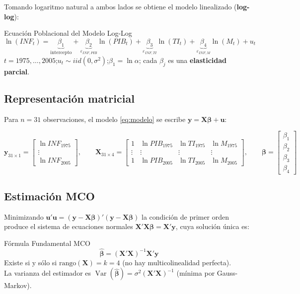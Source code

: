 \documentclass[12pt,a4paper]{article}
\newcommand\bhat{\hat{\bm\beta}}
\newcommand\X{\mathbf{X}}
\newcommand\y{\mathbf{y}}
\newcommand\Xt{\mathbf{X}'}
\newcommand\Var{\operatorname{Var}}
\begin{document}
Tomando logaritmo natural a ambos lados se obtiene el modelo linealizado (\textbf{log-log}):

\begin{frmbox}{Ecuación Poblacional del Modelo Log-Log}
\begin{equation}
\ln(INF_t)=\underbrace{\beta_1}_{\text{intercepto}}
+\underbrace{\beta_2}_{\varepsilon_{INF,PIB}}\ln(PIB_t)
+\underbrace{\beta_3}_{\varepsilon_{INF,TI}}\ln(TI_t)
+\underbrace{\beta_4}_{\varepsilon_{INF,M}}\ln(M_t)
+u_t
\label{eq:modelo}
\end{equation}
$t=1975,\ldots,2005$;\quad$u_t\sim iid(0,\sigma^2)$;\quad$\beta_1=\ln\alpha$;\quad
cada $\beta_j$ es una \textbf{elasticidad parcial}.
\end{frmbox}

\subsection{Representación matricial}

Para $n=31$ observaciones, el modelo \eqref{eq:modelo} se escribe $\y=\X\bm\beta+\bm u$:

\[
\y_{31\times1}=\begin{bmatrix}\ln INF_{1975}\\\vdots\\\ln INF_{2005}\end{bmatrix},\qquad
\X_{31\times4}=\begin{bmatrix}
  1&\ln PIB_{1975}&\ln TI_{1975}&\ln M_{1975}\\
  \vdots&\vdots&\vdots&\vdots\\
  1&\ln PIB_{2005}&\ln TI_{2005}&\ln M_{2005}
\end{bmatrix},\qquad
\bm\beta=\begin{bmatrix}\beta_1\\\beta_2\\\beta_3\\\beta_4\end{bmatrix}
\]

\subsection{Estimación MCO}

Minimizando $\bm u'\bm u=(\y-\X\bm\beta)'(\y-\X\bm\beta)$ la condición de primer orden
produce el sistema de ecuaciones normales $\Xt\X\bm\beta=\Xt\y$, cuya solución única es:

\begin{frmbox}{Fórmula Fundamental MCO}
\begin{equation}
\bhat=(\Xt\X)^{-1}\Xt\y
\label{eq:mco}
\end{equation}
Existe si y sólo si $\mathrm{rango}(\X)=k=4$ (no hay multicolinealidad perfecta).\\
La varianza del estimador es $\Var(\bhat)=\sigma^2(\Xt\X)^{-1}$ (mínima por Gauss-Markov).
\end{frmbox}
\end{document}
